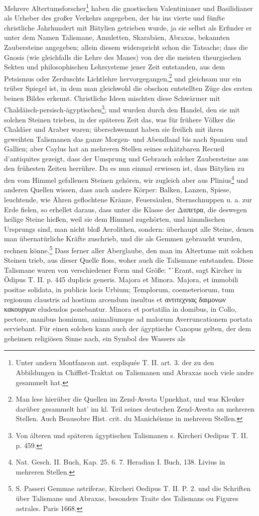\documentclass[a4paper, 11pt, oneside, polutonikogreek, german]{article}
\begin{document}
Mehrere Altertumsforscher\footnote{Unter andern Montfancon ant. expliquée T. II. art. 3. der zu den Abbildungen in Chifflet-Traktat on Talismanen und Abraxas noch viele andre gesammelt hat.} haben die gnostischen Valentinianer und Basilidianer als Urheber des großer Verkehrs angegeben, der bis ins vierte und fünfte christliche Jahrhundert mit Bätylien getrieben wurde, ja sie selbst als Erfinder er unter dem Namen Talismane, Amuletten, Skarabäen, Abraxas, bekannten Zaubersteine angegeben; allein diesem widerspricht schon die Tatsache; dass die Gnosis (wie gleichfalls die Lehre des Manes) von der die meisten theurgischen Sekten und philosophischen Lehrsysteme jener Zeit entstanden, aus dem Petsismus oder Zerduschts Lichtlehre hervorgegangen,\footnote{Man lese hierüber die Quellen im Zend-Avesta Upnekhat, und was Kleuker darüber gesammelt hat' im kl. Teil seines deutschen Zend-Avesta an mehreren Stellen. Auch Beausobre Hist. crit. du Manichéisme in mehreren Stellen.} und gleichsam nur ein trüber Spiegel ist, in dem man gleichwohl die obschon entstellten Züge des ersten beinen Bildes erkennt. Christliche Ideen mischten diese Schwärmer mit Chaldäisch-persisch-ägyptischen\footnote{Von älteren und späteren ägyptischen Talismanen s. Kircheri Oedipus T. II. p. 459.}; und wurden durch den Handel, den sie mit solchen Steinen trieben, in der späteren Zeit das, was für frühere Völker die Chaldäer und Araber waren; überschwemmt haben sie freilich mit ihren geweihten Talismanen das ganze Morgen- und Abendland bis nach Spanien und Gallien; aber Caylus hat an mehreren Stellen seines schätzbaren Recueil d'antiquites gezeigt, dass der Umsprung und Gebrauch solcher Zaubersteine aus den frühesten Zeiten herrühre. Da es nun einmal erwiesen ist, dass Bätylien zu den vom Himmel gefallenen Steinen gehören, wir zugleich aber aus Plinius\footnote{Nat. Gesch. II. Buch, Kap. 25. 6. 7. Heradian I. Buch, 138. Livius in mehreren Stellen.} und anderen Quellen wissen, dass auch andere Körper: Balken, Lanzen, Spiese, leuchtende, wie Ähren geflochtene Kränze, Feuersäulen, Sternschnuppen u. a. zur Erde fielen, so erhellet daraus, dass unter die Klasse der Διιπετρα, die deswegen heilige Steine hießen, weil sie dem Himmel zugehörten, und himmlischen Ursprungs sind, man nicht bloß Aerolithen, sondern: überhaupt alle Steine, denen man übernatürliche Kräfte zuschrieb, und die als Gemmen gebraucht wurden, rechnen könne.\footnote{S. Passeri Gemmae astriferae, Kircheri Oedipus T. II. P. 2. und die Schriften über Talismane und Abraxas, besonders Traite des Talismans ou Figures astrales. Paris 1668.} Dass ferner aller Aberglaube, den man im Altertume mit solchen Steinen trieb, aus dieser Quelle floss, woher auch die Talismane entstanden. Diese Talismane waren von verschiedener Form und Größe: "`Erant, sagt Kircher in Ödipus T. II. p. 445 duplicis generis. Majora et Minora. Majora, et immobili positae solidata, in publicis locis Urbium; Templorum, coemeteriorum, tum regionum claustris ad hostium arcendum insultus et αντιτεχνιας δαιμονων κακουργων eludendos ponebantur. Minora et portatilia in domibus, in Collo, pectore, manibus hominum, animaliumque ad malorum Averruncationem portata serviebant. Für einen solchen kann auch der ägyptische Canopus gelten, der dem geheimen religiösen Sinne nach, ein Symbol des Wassers als 
\end{document}
